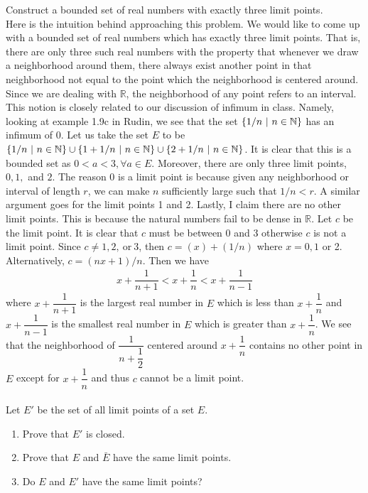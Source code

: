 \documentclass[12pt]{article}
\begin{document}
\begin{enumerate}
\end{enumerate}

\problem Construct a bounded set of real numbers with exactly three limit points. \\ 

Here is the intuition behind approaching this problem. We would like to come up with a bounded set of real numbers which has exactly three limit points. That is, there are only three such real numbers with the property that whenever we draw a neighborhood around them, there always exist another point in that neighborhood not equal to the point which the neighborhood is centered around. Since we are dealing with $\mathbb{R}$, the neighborhood of any point refers to an interval. This notion is closely related to our discussion of infimum  in class. Namely, looking at example 1.9c in Rudin, we see that the set $\left\{1/n~|~n \in \mathbb{N}\right\}$ has an infimum of 0.  Let us take the set $E$ to be $\left\{1/n~|~n \in \mathbb{N}\right\} \cup \left\{1+ 1/n~|~n \in \mathbb{N}\right\} \cup  \left\{2+ 1/n~|~n \in \mathbb{N}\right\}$. It is clear that this is a bounded set as $0 < a < 3, \forall a \in E$. Moreover, there are only three limit points, $0, 1,$ and $2$. The reason 0 is a limit point is because given any neighborhood or interval of length $r$, we can make $n$ sufficiently large such that $1/n < r$. A similar argument goes for the limit points 1 and 2. Lastly, I claim there are no other limit points. This is because the natural numbers fail to be dense in $\mathbb{R}$. Let $c$ be the  limit point. It is clear that $c$ must be between 0 and 3 otherwise $c$ is not a limit point. Since $c \neq 1, 2, ~ \text{or}~ 3$, then $c = (x)+(1/n)$ where $x=0, 1$ or 2. Alternatively, $c= (nx+1)/n$. Then we have 
\begin{align*}
x + \dfrac{1}{n+1} < x + \dfrac{1}{n} < x + \dfrac{1}{n-1}
\end{align*}
where $x + \dfrac{1}{n+1}$ is the largest real number in $E$ which is less than  $x + \dfrac{1}{n}$ and $x + \dfrac{1}{n-1}$ is the smallest real number in $E$ which is greater than $x+ \dfrac{1}{n}$. We see that the neighborhood of $\dfrac{1}{n + \dfrac{1}{2}}$ centered around $x + \dfrac{1}{n}$ contains no other point in $E$ except for $x + \dfrac{1}{n}$ and thus $c$ cannot be a limit point. \\ \\

\problem Let $E'$ be the set of all limit points of a set $E$. 
\begin{enumerate}
\item Prove that $E'$ is closed.
\item Prove that $E$ and $\bar{E}$ have the same limit points.
\item Do $E$ and $E'$ have the same limit points?
\end{enumerate}  
\end{document}
